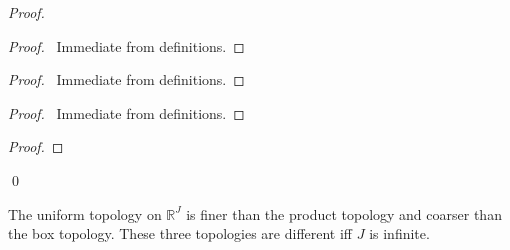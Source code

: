\begin{proof}
  \pf
  \begin{proof}
    \pf\ Immediate from definitions.
  \end{proof}
  \begin{proof}
    \pf\ Immediate from definitions.
  \end{proof}
  \begin{proof}
    \pf\ Immediate from definitions.
  \end{proof}
  \begin{proof}
    \pf
  \end{proof}
  \qed
\end{proof}

\begin{thm}[DC]
  \label{thm:topology:product:compare}
  The uniform topology on $\mathbb{R}^J$ is finer than the product topology
  and coarser than the box topology. These three topologies are different iff
  $J$
  is infinite.
\end{thm}


